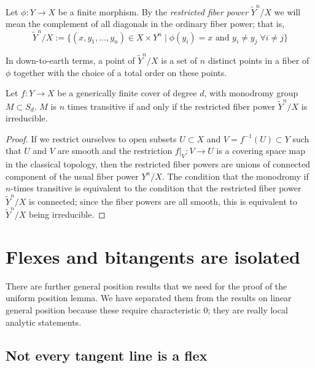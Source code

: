 \begin{definition}
Let $\phi : Y \to X$ be a finite morphism. By the \emph{restricted fiber power} $\tilde Y^n/X$ we will mean the complement of all diagonals in the ordinary fiber power; that is,
$$
\tilde Y^n/X := \{ (x, y_1,\dots, y_n) \in X \times Y^n \mid \phi(y_i) = x \text{ and } y_i \neq y_j \; \forall i \neq j \}
$$
\end{definition}

In down-to-earth terms, a point of $\tilde Y^n/X$ is a set of $n$ distinct points in a fiber of $\phi$ together with
the choice of a total order on these points. 

\begin{lemma}\label{transitivity lemma}
Let $f : Y \to X$ be a generically finite cover of degree $d$, with  monodromy group $M \subset S_d$.
$M$ is $n$ times transitive if and only if the restricted fiber power $\tilde Y^n/X$ is irreducible.
\end{lemma}

\begin{proof}
If we restrict ourselves to open subsets $U \subset X$ and $V = f^{-1}(U) \subset Y$ such that $U$ and $V$ are smooth and the restriction $f|_V : V \to U$ is a covering space map in the classical topology, then the restricted fiber powers are unions of connected component of the usual fiber power $Y^n/X$. The condition that the monodromy if $n$-times transitive is equivalent to the condition that the restricted fiber power $\tilde Y^n/X$ is connected; since the fiber powers are all smooth, this is equivalent to $\tilde Y^n/X$ being irreducible.
\end{proof}

\section{Flexes and bitangents are isolated}\label{isolated flexes and bitangents}

There are  further general position results that we need for the proof of the uniform position lemma.  We have separated
them from the results on linear general position because these require characteristic 0; they are really local analytic
statements.

\subsection{Not every tangent line is a flex}\label{isolated tangents and bitangents}

